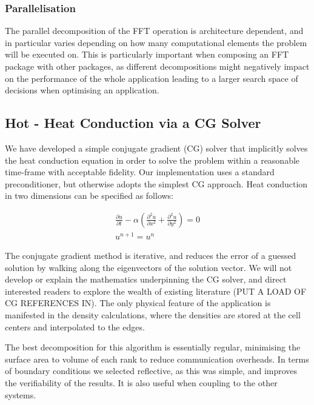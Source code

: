 \documentclass[runningheads,a4paper]{llncs}
\begin{document}
\subsubsection{Parallelisation}

The parallel decomposition of the FFT operation is architecture dependent, and in particular varies depending on how many computational elements the problem will be executed on. This is particularly important when composing an FFT package with other packages, as different decompositions might negatively impact on the performance of the whole application leading to a larger search space of decisions when optimising an application.

\subsection{Hot - Heat Conduction via a CG Solver}

\label{sec:hot}

We have developed a simple conjugate gradient (CG) solver that implicitly solves the heat conduction equation in order to solve the problem within a reasonable time-frame with acceptable fidelity. Our implementation uses a standard preconditioner, but otherwise adopts the simplest CG approach. Heat conduction in two dimensions can be specified as follows:

\begin{align}
  \frac{\partial u}{\partial t} - \alpha (\frac{\partial^2u}{\partial x^2} + \frac{\partial^2u}{\partial y^2}) = 0 \\
  u^{n+1} = u^n
\end{align}

The conjugate gradient method is iterative, and reduces the error of a guessed solution by walking along the eigenvectors of the solution vector. We will not develop or explain the mathematics underpinning the CG solver, and direct interested readers to explore the wealth of existing literature \cite{} (PUT A LOAD OF CG REFERENCES IN). The only physical feature of the application is manifested in the density calculations, where the densities are stored at the cell centers and interpolated to the edges.

The best decomposition for this algorithm is essentially regular, minimising the surface area to volume of each rank to reduce communication overheads. In terms of boundary conditions we selected reflective, as this was simple, and improves the verifiability of the results. It is also useful when coupling to the other systems.
\end{document}
